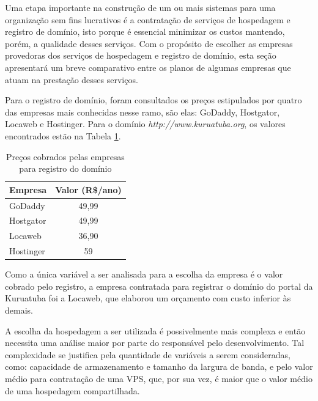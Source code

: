 Uma etapa importante na construção de um ou mais sistemas para uma organização sem fins lucrativos é a contratação de serviços de hospedagem e registro de domínio, isto porque é essencial minimizar os custos mantendo, porém, a qualidade desses serviços. Com o propósito de escolher as empresas provedoras dos serviços de hospedagem e registro de domínio, esta seção apresentará um breve comparativo entre os planos de algumas empresas que atuam na prestação desses serviços.

Para o registro de domínio, foram consultados os preços estipulados por quatro das empresas mais conhecidas nesse ramo, são elas: GoDaddy, Hostgator, Locaweb e Hostinger. Para o domínio \textit{http://www.kuruatuba.org}, os valores encontrados estão na Tabela \ref{comparativo-dominio}. 

\newpage

\begin{table}[h]
\centering
{}
\caption{Preços cobrados pelas empresas para registro do domínio}
\vspace{0.5cm}

\setlength{\extrarowheight}{0.15cm}
\begin{tabular}{l|c}
 
\textbf{Empresa} & \textbf{Valor (R\$/ano)} \\ %
\hline                               %
GoDaddy & 49,99 \\
Hostgator & 49,99 \\
Locaweb & 36,90 \\
Hostinger & 59 \\

\hline   
\end{tabular}
\label{comparativo-dominio}
\end{table}

Como a única variável a ser analisada para a escolha da empresa é o valor cobrado pelo registro, a empresa contratada para registrar o domínio do portal da Kuruatuba foi a Locaweb, que elaborou um orçamento com custo inferior às demais. 

A escolha da hospedagem a ser utilizada é possivelmente mais complexa e então necessita uma análise maior por parte do responsável pelo desenvolvimento. Tal complexidade se justifica pela quantidade de variáveis a serem consideradas, como: capacidade de armazenamento e tamanho da largura de banda, e pelo valor médio para contratação de uma VPS, que, por sua vez, é maior que o valor médio de uma hospedagem compartilhada.

